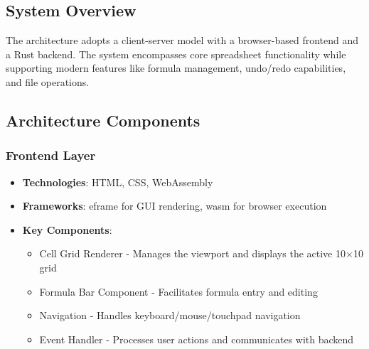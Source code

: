 \documentclass[10pt,a4paper]{article}  %
\begin{document}
\subsection{System Overview}

The architecture adopts a client-server model with a browser-based frontend and a Rust backend. The system encompasses core spreadsheet functionality while supporting modern features like formula management, undo/redo capabilities, and file operations.

\subsection{Architecture Components}

\subsubsection{Frontend Layer}
\begin{itemize}
    \item \textbf{Technologies}: HTML, CSS, WebAssembly
    \item \textbf{Frameworks}: eframe for GUI rendering, wasm for browser execution
    \item \textbf{Key Components}:
    \begin{itemize}
        \item Cell Grid Renderer - Manages the viewport and displays the active 10$\times$10 grid
        \item Formula Bar Component - Facilitates formula entry and editing
        \item Navigation - Handles keyboard/mouse/touchpad navigation
        \item Event Handler - Processes user actions and communicates with backend
       
    \end{itemize}
\end{itemize}
\end{document}
